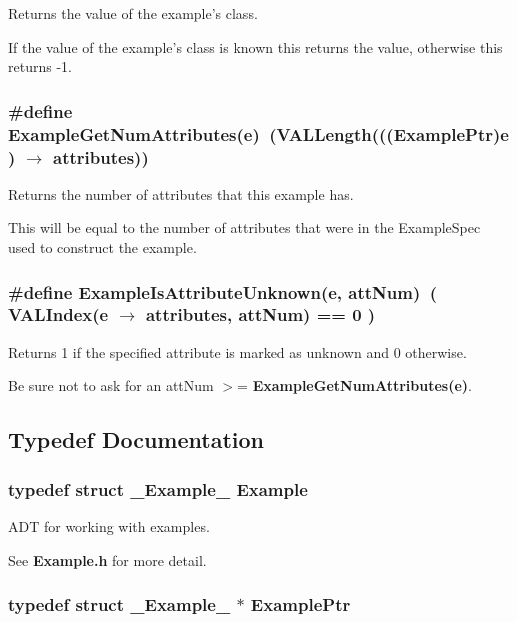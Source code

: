 Returns the value of the example's class. 

If the value of the example's class is known this returns the value, otherwise this returns -1. 
\subsubsection{\setlength{\rightskip}{0pt plus 5cm}\#define Example\-Get\-Num\-Attributes(e)\ (VALLength((({\bf Example\-Ptr})e) $\rightarrow$ attributes))}\label{Example_8h_a1}


Returns the number of attributes that this example has. 

This will be equal to the number of attributes that were in the Example\-Spec used to construct the example. 
\subsubsection{\setlength{\rightskip}{0pt plus 5cm}\#define Example\-Is\-Attribute\-Unknown(e, att\-Num)\ ( VALIndex(e $\rightarrow$ attributes, att\-Num) == 0 )}\label{Example_8h_a0}


Returns 1 if the specified attribute is marked as unknown and 0 otherwise. 

Be sure not to ask for an att\-Num $>$= {\bf Example\-Get\-Num\-Attributes(e)}. 

\subsection{Typedef Documentation}
\subsubsection{\setlength{\rightskip}{0pt plus 5cm}typedef struct {\bf \_\-Example\_\-}  {\bf Example}}\label{Example_8h_a4}


ADT for working with examples. 

See {\bf Example.h} for more detail. 
\subsubsection{\setlength{\rightskip}{0pt plus 5cm}typedef struct {\bf \_\-Example\_\-} $\ast$ {\bf Example\-Ptr}}\label{Example_8h_a5}


